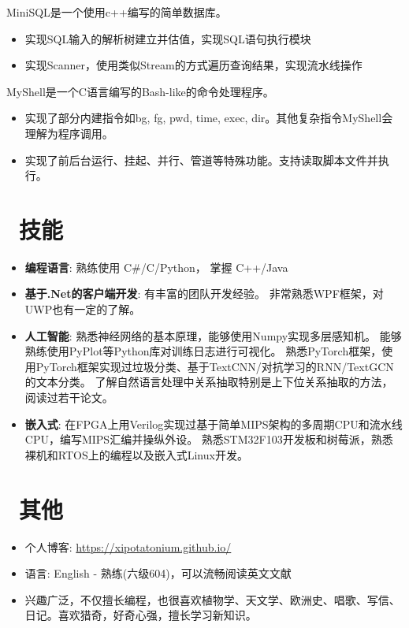 \documentclass{resume}
\begin{document}
MiniSQL是一个使用c++编写的简单数据库。
\begin{itemize}
  \item 实现SQL输入的解析树建立并估值，实现SQL语句执行模块
  \item 实现Scanner，使用类似Stream的方式遍历查询结果，实现流水线操作
\end{itemize}

MyShell是一个C语言编写的Bash-like的命令处理程序。
\begin{itemize}
    \item 实现了部分内建指令如bg, fg, pwd, time, exec, dir。其他复杂指令MyShell会理解为程序调用。
    \item 实现了前后台运行、挂起、并行、管道等特殊功能。支持读取脚本文件并执行。
\end{itemize}

\section{\faCogs\ 技能}
\begin{itemize}[parsep=0.25ex]
    \item \textbf{编程语言}:
        熟练使用 C\#/C/Python，
        掌握 C++/Java

    \item \textbf{基于.Net的客户端开发}:
        有丰富的团队开发经验。
        非常熟悉WPF框架，对UWP也有一定的了解。

    \item \textbf{人工智能}:
        熟悉神经网络的基本原理，能够使用Numpy实现多层感知机。
        能够熟练使用PyPlot等Python库对训练日志进行可视化。
        熟悉PyTorch框架，使用PyTorch框架实现过垃圾分类、基于TextCNN/对抗学习的RNN/TextGCN的文本分类。
        了解自然语言处理中关系抽取特别是上下位关系抽取的方法，阅读过若干论文。

    \item \textbf{嵌入式}:
        在FPGA上用Verilog实现过基于简单MIPS架构的多周期CPU和流水线CPU，编写MIPS汇编并操纵外设。
        熟悉STM32F103开发板和树莓派，熟悉裸机和RTOS上的编程以及嵌入式Linux开发。
\end{itemize}


\section{\faInfo\ 其他}
\begin{itemize}[parsep=0.25ex]
  \item 个人博客: \url{https://xipotatonium.github.io/}
  \item 语言: English - 熟练(六级604)，可以流畅阅读英文文献
  \item 兴趣广泛，不仅擅长编程，也很喜欢植物学、天文学、欧洲史、唱歌、写信、日记。喜欢猎奇，好奇心强，擅长学习新知识。
\end{itemize}
\end{document}
